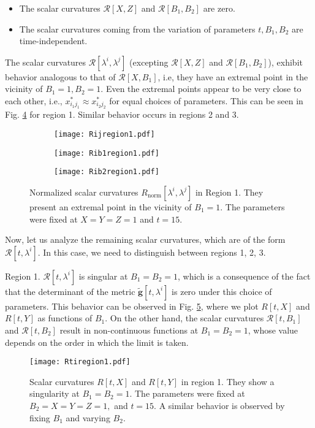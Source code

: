 \documentclass[12pt]{iopart}
\begin{document}
\begin{itemize}
    \item The scalar curvatures $\mathcal{R}[X,Z]$ and $\mathcal{R}[B_1,B_2]$ are zero.
    \item The scalar curvatures coming from the variation of parameters $t,B_1,B_2$ are time-independent.
\end{itemize}

The scalar curvatures $\mathcal{R}[\lambda^i,\lambda^j]$ (excepting $\mathcal{R}[X, Z]$ and $\mathcal{R}[B_1, B_2]$), exhibit behavior analogous to that of $\mathcal{R}[X, B_1]$, i.e, they have an extremal point in the vicinity of $B_1=1, B_2=1$. Even the extremal points appear to be very close to each other, i.e., $x^*_{i_1j_1}\approx x^*_{i_2j_2}$ for equal choices of parameters.  This can be seen in Fig. \ref{fig:Rregion1} for region 1. Similar behavior occurs in regions 2 and 3. 

\begin{figure}[H]
  \centering
  \begin{subfigure}{0.32\linewidth}{\texttt{[image: Rijregion1.pdf]}}
    \caption{}
    \label{fig:Rijregion1}
  \end{subfigure}
  \begin{subfigure}{0.32\linewidth}\texttt{[image: Rib1region1.pdf]}
    \caption{}
    \label{fig:Rib1region1}  
  \end{subfigure}
  \begin{subfigure}{0.32\linewidth}\texttt{[image: Rib2region1.pdf]}
    \caption{}
    \label{fig:Rib2region1}  
  \end{subfigure}  
  \captionsetup{font=small} 
  \caption{\justifying Normalized scalar curvatures $R_{\text{norm}}[\lambda^i,\lambda^j]$ in Region 1. They present an extremal point in the vicinity of $B_1=1$. The parameters were fixed at $X=Y=Z=1$ and $t=15$. }   
    \label{fig:Rregion1}
\end{figure}


Now, let us analyze the remaining scalar curvatures, which are of the form $\mathcal{R}[t,\lambda^i]$. In this case, we need to distinguish between regions 1, 2, 3. 


Region 1. $\mathcal{R}[t,\lambda^i]$ is singular at $B_1=B_2=1$, which is a consequence of the fact that the determinant of the metric $\tilde{\boldsymbol{g}}[t,\lambda^i]$ is zero under this choice of parameters. This behavior can be observed in Fig. \ref{fig:Rtjregion1}, where we plot $R[t,X]$ and $R[t,Y]$ as functions of $B_1$. On the other hand, the scalar curvatures $\mathcal{R}[t, B_1]$ and $\mathcal{R}[t, B_2]$ result in non-continuous functions at $B_1=B_2=1$, whose value depends on the order in which the limit is taken. 
\begin{figure}[h!]
    \centering
    \texttt{[image: Rtiregion1.pdf]}
    \captionsetup{font=small} 
  \caption{\justifying Scalar curvatures $R[t,X]$ and $R[t,Y]$ in region 1. They show a singularity at $B_1=B_2=1$. The parameters were fixed at $B_2=X=Y=Z=1,$ and $t=15$. A similar behavior is observed by fixing $B_1$ and varying $B_2$.}  \label{fig:Rtjregion1}
\end{figure}
\end{document}
